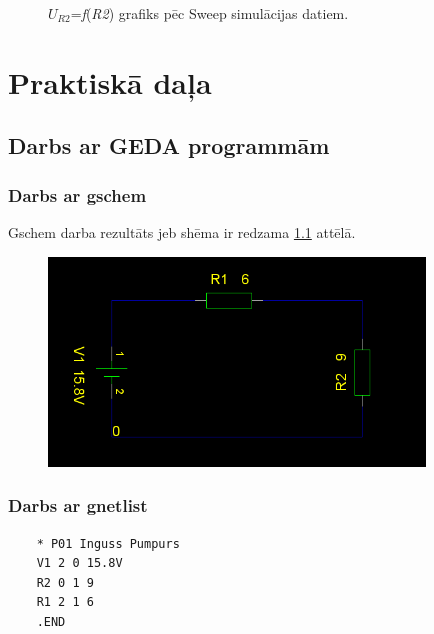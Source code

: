 \documentclass{report}
\begin{document}
\begin{figure}
    \centering
    \caption{$U_{R2}$=\textit{f}(\textit{R2}) grafiks pēc Sweep simulācijas datiem.}\label{plot:1}
\end{figure}


\chapter{Praktiskā daļa}
\section{Darbs ar GEDA programmām}

\subsection{Darbs ar gschem}
Gschem darba rezultāts jeb shēma ir redzama \ref{att:gschem} attēlā.
\begin{figure}[b!]
    \centering
    \includegraphics[width=10cm]{01.png}
    \label{att:gschem}
\end{figure}

\newpage
\subsection{Darbs ar gnetlist}
\begin{verbatim}
    * P01 Inguss Pumpurs
    V1 2 0 15.8V
    R2 0 1 9
    R1 2 1 6
    .END
\end{verbatim}
\end{document}
